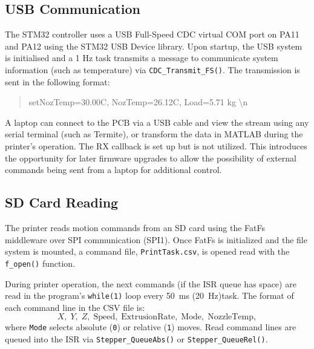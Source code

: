 \subsection{USB Communication}
The STM32 controller uses a USB Full-Speed CDC virtual COM port on PA11 and PA12 using the STM32 USB Device library. Upon startup, the USB system is initialised and a 1 Hz task transmits a message to communicate system information (such as temperature) via \texttt{CDC\_Transmit\_FS()}. The transmission is sent in the following format:
\begin{quote}\ttfamily
setNozTemp=30.00C, NozTemp=26.12C, Load=5.71 kg \textbackslash n
\end{quote}
A laptop can connect to the PCB via a USB cable and view the stream using any serial terminal (such as Termite), or transform the data in MATLAB during the printer's operation. The RX callback is set up but is not utilized. This introduces the opportunity for later firmware upgrades to allow the possibility of external commands being sent from a laptop for additional control. 

\subsection{SD Card Reading}
The printer reads motion commands from an SD card using the FatFs middleware over SPI communication (SPI1). Once FatFs is initialized and the file system is mounted, a command file, \texttt{PrintTask.csv}, is opened read with the \texttt{f\_open()} function.

During printer operation, the next commands (if the ISR queue has space) are read in the program's \texttt{while(1)} loop every 50~ms (20~Hz)task. The format of each command line in the CSV file is:
\[
X,\;Y,\;Z,\;\text{Speed},\;\text{ExtrusionRate},\;\text{Mode},\;\text{NozzleTemp},
\]
where \texttt{Mode} selects absolute (\texttt{0}) or relative (\texttt{1}) moves. Read command lines are queued into the ISR via \texttt{Stepper\_QueueAbs()} or \texttt{Stepper\_QueueRel()}.

